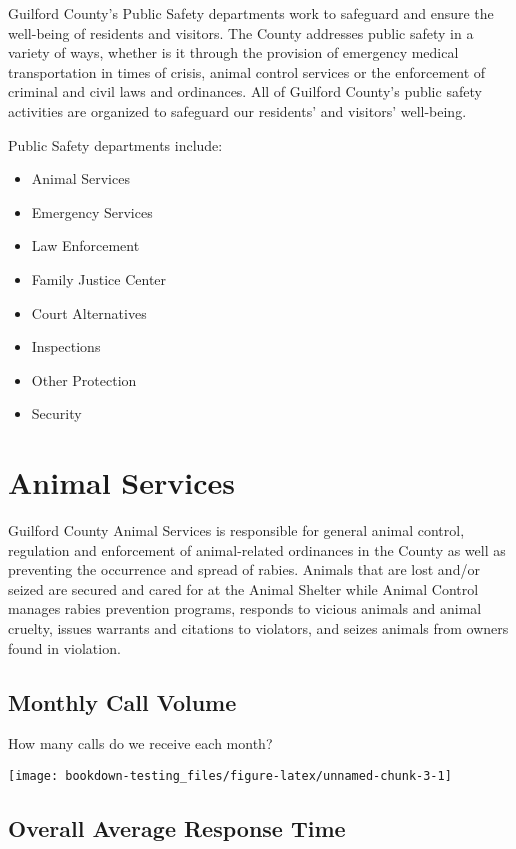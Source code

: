 \documentclass[]{book}
\providecommand{\tightlist}{%
  \setlength{\itemsep}{0pt}\setlength{\parskip}{0pt}}
\begin{document}
Guilford County's Public Safety departments work to safeguard and ensure the well-being of residents and visitors. The County addresses public safety in a variety of ways, whether is it through the provision of emergency medical transportation in times of crisis, animal control services or the enforcement of criminal and civil laws and ordinances. All of Guilford County's public safety activities are organized to safeguard our residents' and visitors' well-being.

Public Safety departments include:

\begin{itemize}
\tightlist
\item
  Animal Services
\item
  Emergency Services
\item
  Law Enforcement
\item
  Family Justice Center
\item
  Court Alternatives
\item
  Inspections
\item
  Other Protection
\item
  Security
\end{itemize}

\hypertarget{animalservices}{%
\chapter{Animal Services}\label{animalservices}}

Guilford County Animal Services is responsible for general animal control, regulation and enforcement of animal-related ordinances in the County as well as preventing the occurrence and spread of rabies. Animals that are lost and/or seized are secured and cared for at the Animal Shelter while Animal Control manages rabies prevention programs, responds to vicious animals and animal cruelty, issues warrants and citations to violators, and seizes animals from owners found in violation.

\hypertarget{monthly-call-volume}{%
\section{Monthly Call Volume}\label{monthly-call-volume}}

How many calls do we receive each month?

\texttt{[image: bookdown-testing\_files/figure-latex/unnamed-chunk-3-1]}

\hypertarget{overall-average-response-time}{%
\section{Overall Average Response Time}\label{overall-average-response-time}}
\end{document}
